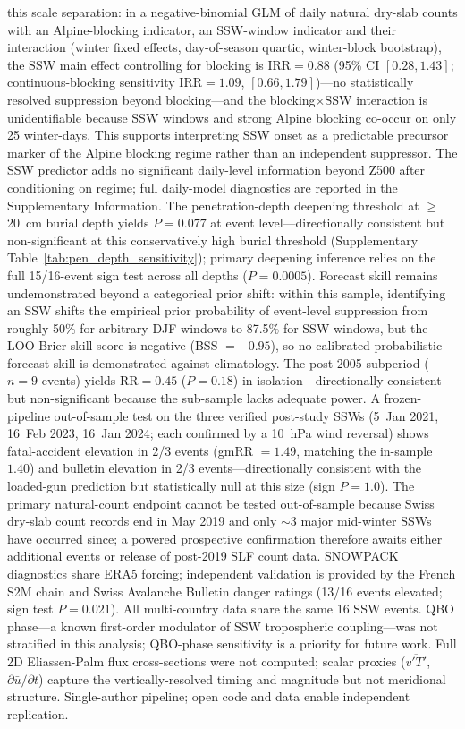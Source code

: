\documentclass[11pt,letterpaper]{article}
\begin{document}
this scale separation: in a negative-binomial GLM of daily natural dry-slab counts with an Alpine-blocking indicator, an SSW-window indicator and their interaction (winter fixed effects, day-of-season quartic, winter-block bootstrap), the SSW main effect controlling for blocking is $\mathrm{IRR} = 0.88$ (95\% CI $[0.28, 1.43]$; continuous-blocking sensitivity $\mathrm{IRR} = 1.09$, $[0.66, 1.79]$)---no statistically resolved suppression beyond blocking---and the blocking$\times$SSW interaction is unidentifiable because SSW windows and strong Alpine blocking co-occur on only 25 winter-days. This supports interpreting SSW onset as a predictable precursor marker of the Alpine blocking regime rather than an independent suppressor. The SSW predictor adds no significant daily-level information beyond Z500 after conditioning on regime; full daily-model diagnostics are reported in the Supplementary Information. The penetration-depth deepening threshold at $\geq$20~cm burial depth yields $P = 0.077$ at event level---directionally consistent but non-significant at this conservatively high burial threshold (Supplementary Table~\ref{tab:pen_depth_sensitivity}); primary deepening inference relies on the full 15/16-event sign test across all depths ($P = 0.0005$). Forecast skill remains undemonstrated beyond a categorical prior shift: within this sample, identifying an SSW shifts the empirical prior probability of event-level suppression from roughly 50\% for arbitrary DJF windows to 87.5\% for SSW windows, but the LOO Brier skill score is negative (BSS $= -0.95$), so no calibrated probabilistic forecast skill is demonstrated against climatology. The post-2005 subperiod ($n = 9$ events) yields $\mathrm{RR} = 0.45$ ($P = 0.18$) in isolation---directionally consistent but non-significant because the sub-sample lacks adequate power. A frozen-pipeline out-of-sample test on the three verified post-study SSWs (5~Jan 2021, 16~Feb 2023, 16~Jan 2024; each confirmed by a 10~hPa wind reversal) shows fatal-accident elevation in 2/3 events (gmRR $= 1.49$, matching the in-sample $1.40$) and bulletin elevation in 2/3 events---directionally consistent with the loaded-gun prediction but statistically null at this size (sign $P = 1.0$). The primary natural-count endpoint cannot be tested out-of-sample because Swiss dry-slab count records end in May 2019 and only $\sim$3 major mid-winter SSWs have occurred since; a powered prospective confirmation therefore awaits either additional events or release of post-2019 SLF count data. SNOWPACK diagnostics share ERA5 forcing; independent validation is provided by the French S2M chain\cite{Vernay2022} and Swiss Avalanche Bulletin danger ratings (13/16 events elevated; sign test $P = 0.021$). All multi-country data share the same 16 SSW events. QBO phase---a known first-order modulator of SSW tropospheric coupling---was not stratified in this analysis; QBO-phase sensitivity is a priority for future work. Full 2D Eliassen-Palm flux cross-sections were not computed; scalar proxies ($\overline{v'T'}$, $\partial\bar{u}/\partial t$) capture the vertically-resolved timing and magnitude but not meridional structure. Single-author pipeline; open code and data enable independent replication.
\end{document}
